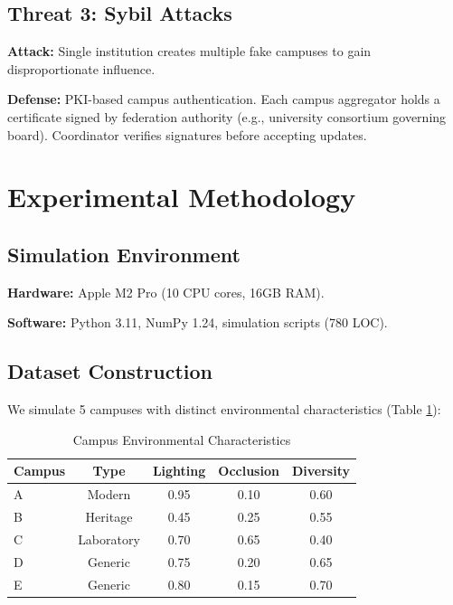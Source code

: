 \documentclass[conference]{IEEEtran}
\begin{document}
\subsection{Threat 3: Sybil Attacks}

\textbf{Attack:} Single institution creates multiple fake campuses to gain disproportionate influence.

\textbf{Defense:} PKI-based campus authentication. Each campus aggregator holds a certificate signed by federation authority (e.g., university consortium governing board). Coordinator verifies signatures before accepting updates.

\section{Experimental Methodology}

\subsection{Simulation Environment}

\textbf{Hardware:} Apple M2 Pro (10 CPU cores, 16GB RAM).

\textbf{Software:} Python 3.11, NumPy 1.24, simulation scripts (780 LOC).

\subsection{Dataset Construction}

We simulate 5 campuses with distinct environmental characteristics (Table \ref{tab:campus_chars}):

\begin{table}[h]
\centering
\caption{Campus Environmental Characteristics}
\label{tab:campus_chars}
\begin{tabular}{lcccc}
\toprule
\textbf{Campus} & \textbf{Type} & \textbf{Lighting} & \textbf{Occlusion} & \textbf{Diversity} \\
\midrule
A & Modern & 0.95 & 0.10 & 0.60 \\
B & Heritage & 0.45 & 0.25 & 0.55 \\
C & Laboratory & 0.70 & 0.65 & 0.40 \\
D & Generic & 0.75 & 0.20 & 0.65 \\
E & Generic & 0.80 & 0.15 & 0.70 \\
\bottomrule
\end{tabular}
\end{table}
\end{document}
